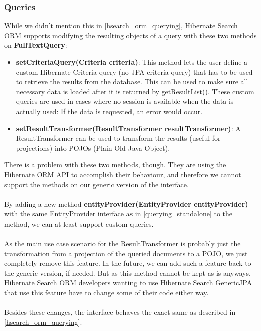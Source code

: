 \pagebreak

\subsubsection{Queries}
While we didn't mention this in \ref{hsearch_orm_querying}, Hibernate Search ORM supports modifying the resulting objects of a query with these two methods on \textbf{FullTextQuery}:

\begin{itemize}
	\item \textbf{setCriteriaQuery(Criteria criteria)}:
		This method lets the user define a custom Hibernate Criteria query (no JPA criteria query) that has to be used to retrieve the results from the database. This can be used to make sure all necessary data is loaded after it is returned by getResultList(). These custom queries are  used in cases where no session is available when the data is actually used: If the data is requested, an error would occur.
	\item \textbf{setResultTransformer(ResultTransformer resultTransformer)}:
		A ResultTransformer can be used to transform the results (useful for projections) into POJOs (Plain Old Java Object).
\end{itemize}
\noindent
There is a problem with these two methods, though. They are using the Hibernate ORM API to accomplish their behaviour, and therefore we cannot support the methods on our generic version of the interface.
\\\\
By adding a new method \textbf{entityProvider(EntityProvider entityProvider)} with the same EntityProvider interface as in \ref{querying_standalone} to the method, we can at least support custom queries.
\\\\
As the main use case scenario for the ResultTransformer is probably just the transformation from a projection of the queried documents to a POJO, we just completely remove this feature. In the future, we can add such a feature back to the generic version, if needed. But as this method cannot be kept as-is anyways, Hibernate Search ORM developers wanting to use Hibernate Search GenericJPA that use this feature have to change some of their code either way.
\\\\
Besides these changes, the interface behaves the exact same as described in \ref{hsearch_orm_querying}.

\pagebreak

